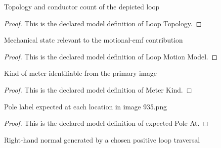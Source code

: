 \begin{definition}
  \label{def:physics:phyx-mini-0935:phyxminiproblems-problemphyxmini0935-looptopology}
  Topology and conductor count of the depicted loop
\end{definition}
\begin{proof}
  This is the declared model definition of Loop Topology.
\end{proof}
\begin{definition}
  \label{def:physics:phyx-mini-0935:phyxminiproblems-problemphyxmini0935-loopmotionmodel}
  Mechanical state relevant to the motional-emf contribution
\end{definition}
\begin{proof}
  This is the declared model definition of Loop Motion Model.
\end{proof}
\begin{definition}
  \label{def:physics:phyx-mini-0935:phyxminiproblems-problemphyxmini0935-meterkind}
  Kind of meter identifiable from the primary image
\end{definition}
\begin{proof}
  This is the declared model definition of Meter Kind.
\end{proof}
\begin{definition}
  \label{def:physics:phyx-mini-0935:phyxminiproblems-problemphyxmini0935-expectedpoleat}
  Pole label expected at each location in image 935.png
\end{definition}
\begin{proof}
  This is the declared model definition of expected Pole At.
\end{proof}
\begin{definition}
  \label{def:physics:phyx-mini-0935:phyxminiproblems-problemphyxmini0935-righthandnormal}
  Right-hand normal generated by a chosen positive loop traversal
\end{definition}
